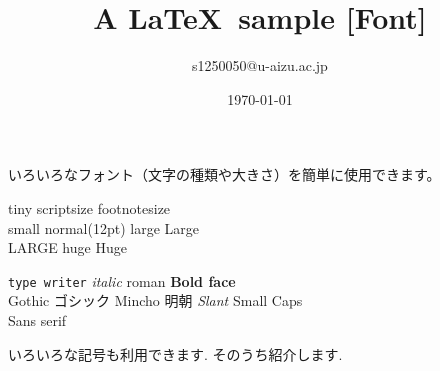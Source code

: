 ﻿\documentclass[a4paper]{jarticle}
\title{A \LaTeX ~sample [Font]}
\author{s1250050@u-aizu.ac.jp}
\date{\today}
\begin{document}
\maketitle

いろいろなフォント（文字の種類や大きさ）を簡単に使用できます。
\begin{center}
{\tiny tiny} {\scriptsize scriptsize}
{\footnotesize footnotesize}\\
{\small small} {normal(12pt)}
{\large large} {\Large Large} \\
{\LARGE LARGE} {\huge huge} {\Huge Huge}
\end{center}

\begin{center}
{\Large
{\tt type writer} {\it italic}
{\rm roman} {\bf Bold face} \\
{\gt Gothic ゴシック} {\mc Mincho 明朝}
{\sl Slant} {\sc Small Caps} \\
{\sf Sans serif}
}
\end{center}
いろいろな記号も利用できます. そのうち紹介します.
\end{document}
